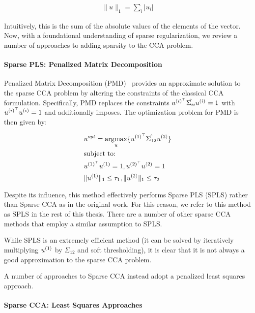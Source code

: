 \begin{align}
    \|u\|_1 = \sum_i |u_i|
\end{align}

Intuitively, this is the sum of the absolute values of the elements of the vector.
Now, with a foundational understanding of sparse regularization, we review a number of approaches to adding sparsity to the CCA problem.

\paragraph{Sparse PLS: Penalized Matrix Decomposition}
Penalized Matrix Decomposition (PMD)~\citep{witten2009penalized} provides an approximate solution to the sparse CCA problem by altering the constraints of the classical CCA formulation.
Specifically, PMD replaces the constraints \(u^{(i)^{\top}} \hat{\Sigma_{ii}} u^{(i)} = 1\) with \(u^{(i)^{\top}} u^{(i)}= 1\) and additionally imposes.
The optimization problem for PMD is then given by:

\begin{align}
    & u^{opt}=\underset{u}{\mathrm{argmax}}\{ u^{(1)^{\top}} \hat{\Sigma_{12}} u^{(2)} \} \\
    & \text{subject to:} \notag \\
    & u^{(1)^{\top}} u^{(1)} = 1 , u^{(2)^{\top}} u^{(2)} = 1 \notag \\
    & \|u^{(1)}\|_1 \leq \tau_1 , \|u^{(2)}\|_1 \leq \tau_2 \notag
\end{align}

Despite its influence, this method effectively performs Sparse PLS (SPLS) rather than Sparse CCA as in the original work.
For this reason, we refer to this method as SPLS in the rest of this thesis.
There are a number of other sparse CCA methods that employ a similar assumption to SPLS\citep{parkhomenko2009sparse, waaijenborg2008quantifying}.

While SPLS is an extremely efficient method (it can be solved by iteratively multiplying $u^{(1)}$ by $\hat{\Sigma_{12}}$ and soft thresholding), it is clear that it is not always a good approximation to the sparse CCA problem.

A number of approaches to Sparse CCA instead adopt a penalized least squares approach.

\paragraph{Sparse CCA: Least Squares Approaches}

